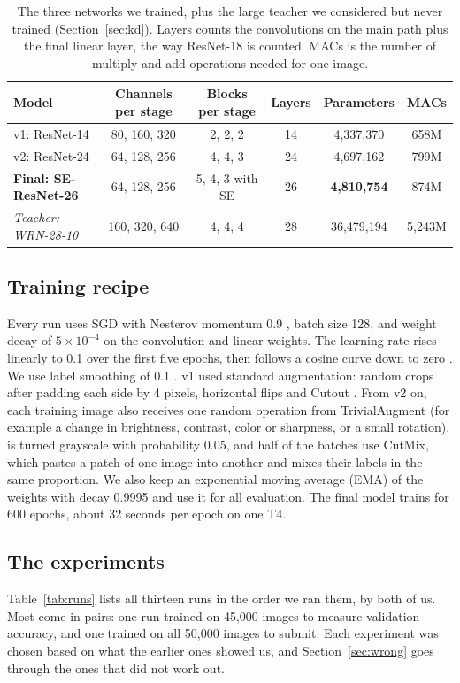 \documentclass{article}
\begin{document}
\begin{table}[h]
\centering\small
\caption{The three networks we trained, plus the large teacher we considered but never trained (Section~\ref{sec:kd}).
Layers counts the convolutions on the main path plus the final linear layer, the way ResNet-18 is counted. MACs is the
number of multiply and add operations needed for one image.}
\label{tab:arch}
\begin{tabular}{lccccc}
\toprule
Model & Channels per stage & Blocks per stage & Layers & Parameters & MACs \\
\midrule
v1: ResNet-14 & 80, 160, 320 & 2, 2, 2 & 14 & 4,337,370 & 658M \\
v2: ResNet-24 & 64, 128, 256 & 4, 4, 3 & 24 & 4,697,162 & 799M \\
\textbf{Final: SE-ResNet-26} & 64, 128, 256 & 5, 4, 3 with SE & 26 & \textbf{4,810,754} & 874M \\
\midrule
\textit{Teacher: WRN-28-10} & 160, 320, 640 & 4, 4, 4 & 28 & 36,479,194 & 5,243M \\
\bottomrule
\end{tabular}
\end{table}

\subsection{Training recipe}
\label{sec:recipe}
Every run uses SGD with Nesterov momentum 0.9 \citep{sutskever2013momentum}, batch size 128, and weight decay of
$5\times10^{-4}$ on the convolution and linear weights. The learning rate rises linearly to 0.1 over the first five epochs,
then follows a cosine curve down to zero \citep{loshchilov2017sgdr}. We use label smoothing of 0.1 \citep{szegedy2016inception}.
v1 used standard augmentation: random crops after padding each side by 4 pixels, horizontal flips and Cutout
\citep{devries2017cutout}. From v2 on, each training image also receives one random operation from TrivialAugment (for
example a change in brightness, contrast, color or sharpness, or a small rotation), is turned grayscale with probability
0.05, and half of the batches use CutMix, which pastes a patch of one image into another and mixes their labels in the
same proportion. We also keep an exponential moving average (EMA) of the weights with decay 0.9995
\citep{polyak1992averaging} and use it for all evaluation. The final model trains for 600 epochs, about 32 seconds per
epoch on one T4.

\subsection{The experiments}
Table~\ref{tab:runs} lists all thirteen runs in the order we ran them, by both of us. Most come in pairs: one run trained on
45,000 images to measure validation accuracy, and one trained on all 50,000 images to submit. Each experiment was chosen
based on what the earlier ones showed us, and Section~\ref{sec:wrong} goes through the ones that did not work out.
\end{document}
